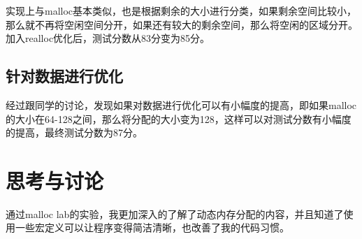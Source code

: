\documentclass{article}
\theoremstyle{plain}
\theoremstyle{definition}
\theoremstyle{remark}
\begin{document}
    实现上与malloc基本类似，也是根据剩余的大小进行分类，如果剩余空间比较小，那么就不再将空闲空间分开，如果还有较大的剩余空间，那么将空闲的区域分开。加入realloc优化后，测试分数从83分变为85分。

    \subsection{针对数据进行优化}
    经过跟同学的讨论，发现如果对数据进行优化可以有小幅度的提高，即如果malloc的大小在64-128之间，那么将分配的大小变为128，这样可以对测试分数有小幅度的提高，最终测试分数为87分。

    \section{思考与讨论}
    通过malloc lab的实验，我更加深入的了解了动态内存分配的内容，并且知道了使用一些宏定义可以让程序变得简洁清晰，也改善了我的代码习惯。
\end{document}

